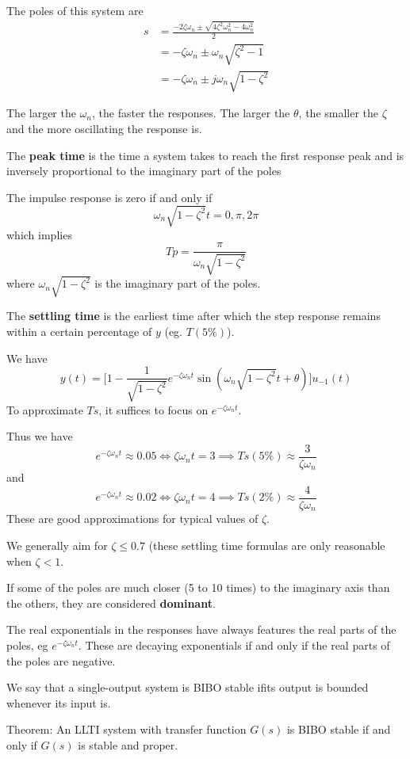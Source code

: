 \documentclass[12pt]{article}
\begin{document}
The poles of this system are
\begin{align*}
s &= \frac{-2\zeta\omega_n \pm \sqrt{4\zeta^2\omega_n^2 - 4\omega_n^2}}{2} \\
&= -\zeta\omega_n \pm \omega_n\sqrt{\zeta^2- 1} \\
&= -\zeta\omega_n \pm j\omega_n\sqrt{1 - \zeta^2}
\end{align*}

The larger the $\omega_n$, the faster the responses. The larger the $\theta$, the smaller the $\zeta$ and the more oscillating the response is.

The {\bf peak time} is the time a system takes to reach the first response peak and is inversely proportional to the imaginary part of the poles

The impulse response is zero if and only if \[ \omega_n \sqrt{1 - \zeta^2} t = 0, \pi, 2\pi \] which implies \[ Tp = \frac{\pi}{\omega_n \sqrt{1 - \zeta^2}} \] where $\omega_n \sqrt{1 - \zeta^2}$ is the imaginary part of the poles.

The {\bf settling time} is the earliest time after which the step response remains within a certain percentage of $y$ (eg. $T(5\%)$).

We have \[ y(t) = \bigl[ 1 - \frac{1}{\sqrt{1 - \zeta^2}} e^{-\zeta\omega_n t} \sin(\omega_n \sqrt{1 - \zeta^2} t + \theta) \bigl] u_{-1}(t) \] To approximate $Ts$, it suffices to focus on $e^{-\zeta\omega_n t}$.

Thus we have \[ e^{-\zeta\omega_n t} \approx 0.05 \iff \zeta\omega_n t = 3 \implies Ts(5\%) \approx \frac{3}{\zeta\omega_n} \] and \[ e^{-\zeta\omega_n t} \approx 0.02 \iff \zeta\omega_n t = 4 \implies Ts(2\%) \approx \frac{4}{\zeta\omega_n} \] These are good approximations for typical values of $\zeta$.

We generally aim for $\zeta \leq 0.7$ (these settling time formulas are only reasonable when $\zeta < 1$.

If some of the poles are much closer (5 to 10 times) to the imaginary axis than the others, they are considered {\bf dominant}.

The real exponentials in the responses have always features the real parts of the poles, eg $e^{-\zeta\omega_n t}$. These are decaying exponentials if and only if the real parts of the poles are negative.

We say that a single-output system is BIBO stable ifits output is bounded whenever its input is.

Theorem: An LLTI system with transfer function $G(s)$ is BIBO stable if and only if $G(s)$ is stable and proper.
\end{document}
